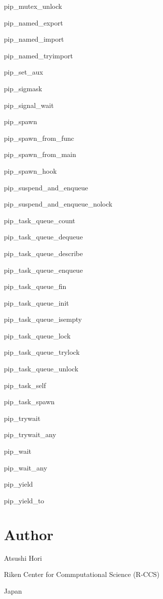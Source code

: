 \begin{DoxyItemize}
\item pip\-\_\-mutex\-\_\-unlock
\item pip\-\_\-named\-\_\-export
\item pip\-\_\-named\-\_\-import
\item pip\-\_\-named\-\_\-tryimport
\item pip\-\_\-set\-\_\-aux
\item pip\-\_\-sigmask
\item pip\-\_\-signal\-\_\-wait
\item pip\-\_\-spawn
\item pip\-\_\-spawn\-\_\-from\-\_\-func
\item pip\-\_\-spawn\-\_\-from\-\_\-main
\item pip\-\_\-spawn\-\_\-hook
\item pip\-\_\-suspend\-\_\-and\-\_\-enqueue
\item pip\-\_\-suspend\-\_\-and\-\_\-enqueue\-\_\-nolock
\item pip\-\_\-task\-\_\-queue\-\_\-count
\item pip\-\_\-task\-\_\-queue\-\_\-dequeue
\item pip\-\_\-task\-\_\-queue\-\_\-describe
\item pip\-\_\-task\-\_\-queue\-\_\-enqueue
\item pip\-\_\-task\-\_\-queue\-\_\-fin
\item pip\-\_\-task\-\_\-queue\-\_\-init
\item pip\-\_\-task\-\_\-queue\-\_\-isempty
\item pip\-\_\-task\-\_\-queue\-\_\-lock
\item pip\-\_\-task\-\_\-queue\-\_\-trylock
\item pip\-\_\-task\-\_\-queue\-\_\-unlock
\item pip\-\_\-task\-\_\-self
\item pip\-\_\-task\-\_\-spawn
\item pip\-\_\-trywait
\item pip\-\_\-trywait\-\_\-any
\item pip\-\_\-wait
\item pip\-\_\-wait\-\_\-any
\item pip\-\_\-yield
\item pip\-\_\-yield\-\_\-to
\end{DoxyItemize}

\section*{Author}

Atsushi Hori\par
Riken Center for Commputational Science (R-\/\-C\-C\-S)\par
Japan\par
